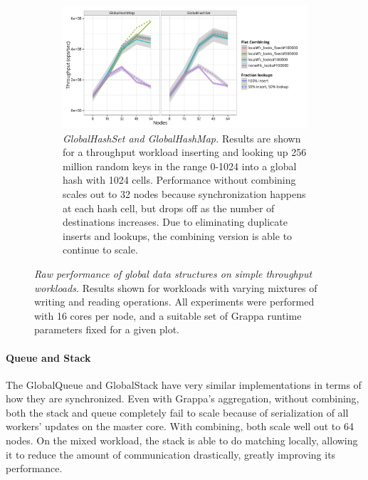 \begin{figure}[t]
  \begin{subfigure}[b]{0.9\textwidth}
  \centering
  \includegraphics[width=\textwidth]{data/plots/hash_perf.pdf}
  \caption{\emph{GlobalHashSet and GlobalHashMap.}
    Results are shown for a throughput workload inserting and looking up 256 million random keys in the range 0-1024 into a global hash with 1024 cells. 
    Performance without combining scales out to 32 nodes because synchronization happens at each hash cell, but drops off as the number of destinations increases. Due to eliminating duplicate inserts and lookups, the combining version is able to continue to scale.}
  \label{fig:hash_perf}
  \end{subfigure}
  \caption{
    \emph{Raw performance of global data structures on simple throughput workloads.}
    Results shown for workloads with varying mixtures of writing and reading operations. All experiments were performed with 16 cores per node, and a suitable set of Grappa runtime parameters fixed for a given plot.
  }\label{fig:datastructs}
\end{figure}

\paragraph{Queue and Stack}
The GlobalQueue and GlobalStack have very similar implementations in terms of how they are synchronized. Even with Grappa's aggregation, without combining, both the stack and queue completely fail to scale because of serialization of all workers' updates on the master core.
With combining, both scale well out to 64 nodes.
On the mixed workload, the stack is able to do matching locally, allowing it to reduce the amount of communication drastically, greatly improving its performance.

